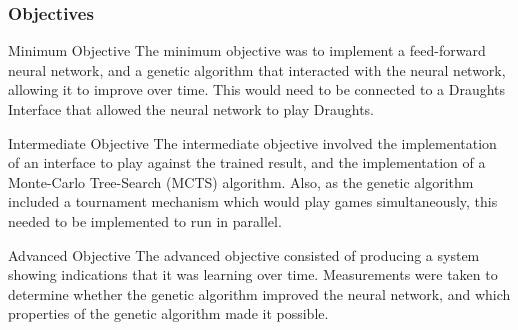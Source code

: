 \documentclass{beamer}
\begin{document}

  \begin{frame}
    \frametitle{Objectives}



    \begin{block}{Minimum Objective}
      The minimum objective was to implement a feed-forward neural network, and a genetic algorithm that interacted with the neural network, allowing it to improve over time. This would need to be connected to a Draughts Interface that allowed the neural network to play Draughts. 

      \end{block}

        
    \begin{block}{Intermediate Objective}
        The intermediate objective involved the implementation of an interface to play against the trained result, and the implementation of a Monte-Carlo Tree-Search (MCTS) algorithm. Also, as the genetic algorithm included a tournament mechanism which would play games simultaneously, this needed to be implemented to run in parallel.
        
      \end{block}

        
    \begin{block}{Advanced Objective}
        The advanced objective consisted of producing a system showing indications that it was learning over time. Measurements were taken to determine whether the genetic algorithm improved the neural network, and which properties of the genetic algorithm made it possible.
    
      \end{block}

        
  \end{frame}
\end{document}
